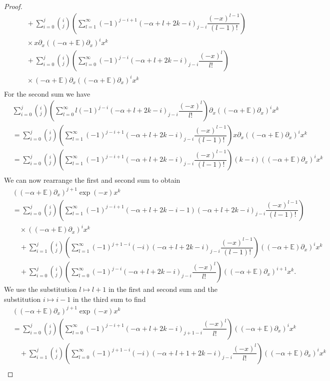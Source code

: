 \documentclass{amsart}
\numberwithin{theorem}{section}
\theoremstyle{definition}
\theoremstyle{remark}
\def\E{\mathds{E} }
\newcommand{\pt}[1]{\partial_{#1}}
\newcommand{\ds}[1]{\mathds{#1}}
\begin{document}
\begin{proof}
\begin{align*}
&\quad + \sum_{i=0}^j\binom{i}{j}\left(\sum_{l=1}^\infty(-1)^{j-i+1}(-\alpha+l+2k-i)_{j-i}\dfrac{(-x)^{l-1}}{(l-1)!}\right)\\
&\quad \times x\pt x((-\alpha+\E)\pt x)^ix^k\\
&\quad + \sum_{i=0}^j\binom{i}{j}\left(\sum_{l=0}^\infty(-1)^{j-i}(-\alpha+l+2k-i)_{j-i}\dfrac{(-x)^l}{l!}\right)\\
&\quad \times (-\alpha+\ds E)\pt x((-\alpha+\E)\pt x)^ix^k\\
\end{align*}
For the second sum we have
\begin{align*}
&\sum_{i=0}^j\binom{i}{j}\left(\sum_{l=0}^\infty l(-1)^{j-i}(-\alpha+l+2k-i)_{j-i}\dfrac{(-x)^l}{l!}\right)\pt x((-\alpha+\E)\pt x)^ix^k\\
&= \sum_{i=0}^j\binom{i}{j}\left(\sum_{l=1}^\infty(-1)^{j-i+1}(-\alpha+l+2k-i)_{j-i}\dfrac{(-x)^{l-1}}{(l-1)!}\right)x\pt x((-\alpha+\E)\pt x)^ix^k\\
&= \sum_{i=0}^j\binom{i}{j}\left(\sum_{l=1}^\infty(-1)^{j-i+1}(-\alpha+l+2k-i)_{j-i}\dfrac{(-x)^{l-1}}{(l-1)!}\right)(k-i)((-\alpha+\E)\pt x)^ix^k\\
\end{align*}
We can now rearrange the first and second sum to obtain
\begin{align*}
&((-\alpha+\ds E)\pt x)^{j+1} \exp(-x)x^k\\
& = \sum_{i=0}^j\binom{i}{j}\left(\sum_{l=1}^\infty(-1)^{j-i+1}(-\alpha+l+2k-i-1)(-\alpha+l+2k-i)_{j-i}\dfrac{(-x)^{l-1}}{(l-1)!}\right)\\
&\quad \times((-\alpha+\E)\pt x)^ix^k\\
&\quad + \sum_{i=1}^j\binom{i}{j}\left(\sum_{l=1}^\infty(-1)^{j+1-i}(-i)(-\alpha+l+2k-i)_{j-i}\dfrac{(-x)^{l-1}}{(l-1)!}\right)((-\alpha+\E)\pt x)^ix^k\\
&\quad + \sum_{i=0}^j\binom{i}{j}\left(\sum_{l=0}^\infty(-1)^{j-i}(-\alpha+l+2k-i)_{j-i}\dfrac{(-x)^{l}}{l!}\right)((-\alpha+\E)\pt x)^{i+1}x^k.
\end{align*}
We use the substitution $l\mapsto l+1$ in the first and second sum and the substitution $i\mapsto i-1$ in the third sum to find
\begin{align*}
&((-\alpha+\ds E)\pt x)^{j+1} \exp(-x)x^k\\
& = \sum_{i=0}^j\binom{i}{j}\left(\sum_{l=0}^\infty(-1)^{j-i+1}(-\alpha+l+2k-i)_{j+1-i}\dfrac{(-x)^{l}}{l!}\right)((-\alpha+\E)\pt x)^ix^k\\
&\quad + \sum_{i=1}^j\binom{i}{j}\left(\sum_{l=0}^\infty(-1)^{j+1-i}(-i)(-\alpha+l+1+2k-i)_{j-i}\dfrac{(-x)^{l}}{l!}\right)((-\alpha+\E)\pt x)^ix^k\\

\end{align*}
\end{proof}
\end{document}
